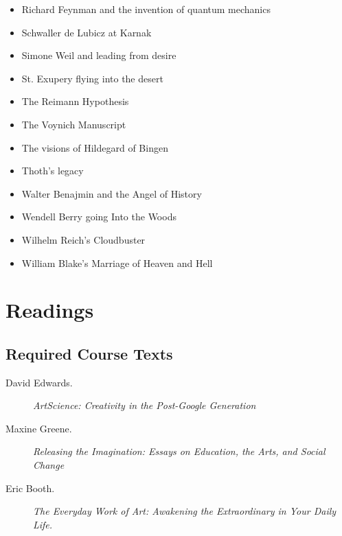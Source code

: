 \documentclass[10pt,DIV09,letterpaper,oneside,headsepline]{scrreprt}
\begin{document}
\begin{itemize}
\item Richard Feynman and the invention of quantum mechanics
\item Schwaller de Lubicz at Karnak
\item Simone Weil and leading from desire
\item St. Exupery flying into the desert
\item The Reimann Hypothesis
\item The Voynich Manuscript
\item The visions of Hildegard of Bingen
\item Thoth's legacy
\item Walter Benajmin and the Angel of History
\item Wendell Berry going Into the Woods
\item Wilhelm Reich's Cloudbuster
\item William Blake's Marriage of Heaven and Hell

\end{itemize}

\section{Readings}
\subsection{Required Course Texts}

\begin{description}
\item [David Edwards.] \textit{ArtScience: Creativity in the Post-Google Generation}
\item [Maxine Greene.] \textit{Releasing the Imagination: Essays on Education, the Arts, and Social Change}
\item [Eric Booth.] \textit{The Everyday Work of Art: Awakening the Extraordinary in Your Daily Life.}
\end{description}
\end{document}
